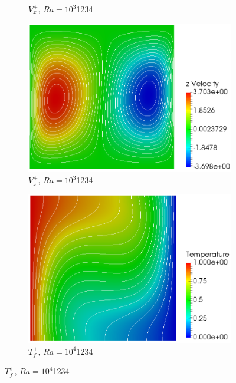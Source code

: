 \begin{figure}[!h]
\begin{subfigure}{0.32\textwidth}
  \caption{\(V_x^+\), \(Ra=10^3\)\color{white}1234}
    \vspace*{0.5em}
\end{subfigure}
\begin{subfigure}{0.32\textwidth}
  \centering
  \includegraphics[width=\linewidth]{figs/Ra3_v.png}
  \caption{\(V_z^+\), \(Ra=10^3\)\color{white}1234}
  \vspace*{0.5em}
\end{subfigure}
\begin{subfigure}{0.32\textwidth}
  \centering
  \includegraphics[width=\linewidth]{figs/Ra4_t.png}
  \caption{\(T_f^+\), \(Ra=10^4\)\color{white}1234}
    \vspace*{0.5em}
\end{subfigure}

\end{figure}
